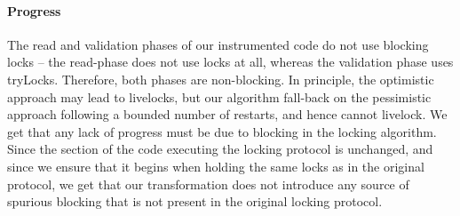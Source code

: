 \paragraph{Progress}
The read and validation phases of our instrumented code do not use blocking locks -- the read-phase does not use locks at all, whereas the 
validation phase uses tryLocks. Therefore, both phases are non-blocking. In principle, the optimistic approach may lead to livelocks, but 
our algorithm fall-back on the pessimistic approach following a bounded number of restarts, and hence cannot livelock. We get that any lack
of progress must be due to blocking in the locking algorithm. Since the section of the code executing the locking protocol is unchanged, and
since we ensure that it begins when holding the same locks as in the original protocol, we get that our transformation does not introduce any
source of spurious blocking that is not present in the original locking protocol. 



